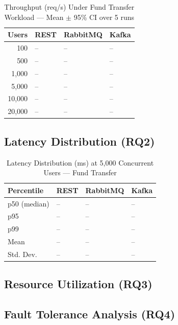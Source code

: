 \documentclass[journal]{IEEEtran}
\begin{document}
\begin{table}[!t]
\caption{Throughput (req/s) Under Fund Transfer Workload --- Mean $\pm$ 95\% CI over 5 runs}
\label{tab:throughput_results}
\centering
\scriptsize
\begin{tabularx}{\columnwidth}{rXXX}
\toprule
\textbf{Users} & \textbf{REST} & \textbf{RabbitMQ} & \textbf{Kafka} \\
\midrule
100 & -- & -- & -- \\
500 & -- & -- & -- \\
1,000 & -- & -- & -- \\
5,000 & -- & -- & -- \\
10,000 & -- & -- & -- \\
20,000 & -- & -- & -- \\
\bottomrule
\end{tabularx}
\end{table}

\subsection{Latency Distribution (RQ2)}
\label{subsec:results_latency}

\begin{table}[!t]
\caption{Latency Distribution (ms) at 5,000 Concurrent Users --- Fund Transfer}
\label{tab:latency_results}
\centering
\scriptsize
\begin{tabularx}{\columnwidth}{lXXX}
\toprule
\textbf{Percentile} & \textbf{REST} & \textbf{RabbitMQ} & \textbf{Kafka} \\
\midrule
p50 (median) & -- & -- & -- \\
p95 & -- & -- & -- \\
p99 & -- & -- & -- \\
Mean & -- & -- & -- \\
Std. Dev. & -- & -- & -- \\
\bottomrule
\end{tabularx}
\end{table}

\subsection{Resource Utilization (RQ3)}
\label{subsec:results_resources}


\subsection{Fault Tolerance Analysis (RQ4)}
\label{subsec:results_fault}
\end{document}
